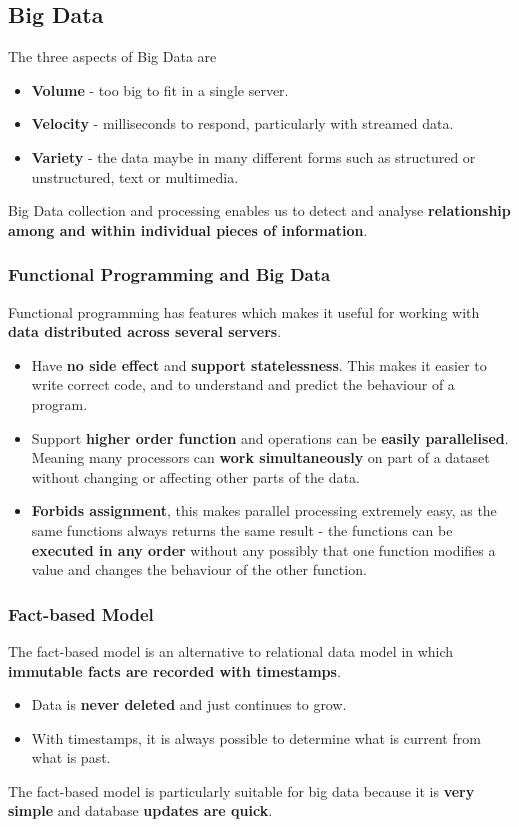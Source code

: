 \subsection{Big Data}

The three aspects of Big Data are
\begin{itemize}
    \item \textbf{Volume} - too big to fit in a single server.
    \item \textbf{Velocity} - milliseconds to respond, particularly with streamed data.
    \item \textbf{Variety} - the data maybe in many different forms such as structured or unstructured, text or multimedia.
\end{itemize}

Big Data collection and processing enables us to detect and analyse \textbf{relationship among and within individual pieces of information}.

\subsubsection*{Functional Programming and Big Data}

Functional programming has features which makes it useful for working with \textbf{data distributed across several servers}.
\begin{itemize}
    \item Have \textbf{no side effect} and \textbf{support statelessness}. This makes it easier to write correct code, and to understand and predict the behaviour of a program.
    \item Support \textbf{higher order function} and operations can be \textbf{easily parallelised}. Meaning many processors can \textbf{work simultaneously} on part of a dataset without changing or affecting other parts of the data.
    \item \textbf{Forbids assignment}, this makes parallel processing extremely easy, as the same functions always returns the same result - the functions can be \textbf{executed in any order} without any possibly that one function modifies a value and changes the behaviour of the other function.
\end{itemize}

\subsubsection*{Fact-based Model}

The fact-based model is an alternative to relational data model in which \textbf{immutable facts are recorded with timestamps}.
\begin{itemize}
    \item Data is \textbf{never deleted} and just continues to grow.
    \item With timestamps, it is always possible to determine what is current from what is past.
\end{itemize}
The fact-based model is particularly suitable for big data because it is \textbf{very simple} and database \textbf{updates are quick}.

